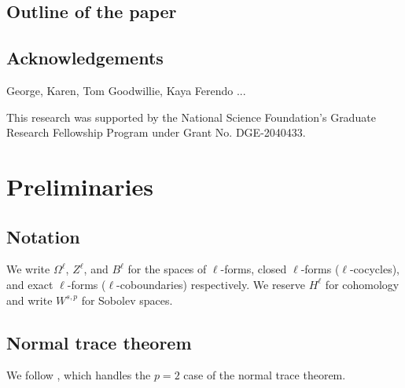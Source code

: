 \documentclass[reqno,11pt]{amsart}
\theoremstyle{definition}
\numberwithin{equation}{section}
\begin{document}
\subsection{Outline of the paper}
 
\subsection{Acknowledgements}
George, Karen, Tom Goodwillie, Kaya Ferendo ...

This research was supported by the National Science Foundation's Graduate Research Fellowship Program under Grant No. DGE-2040433.

\section{Preliminaries}
\subsection{Notation}
We write $\Omega^\ell$, $Z^\ell$, and $B^\ell$ for the spaces of $\ell$-forms, closed $\ell$-forms ($\ell$-cocycles), and exact $\ell$-forms ($\ell$-coboundaries) respectively.
We reserve $H^\ell$ for cohomology and write $W^{s, p}$ for Sobolev spaces.

\subsection{Normal trace theorem}
We follow \cite[Chapter I, Theorem 1.2]{temam2016navier}, which handles the $p = 2$ case of the normal trace theorem.
\end{document}

